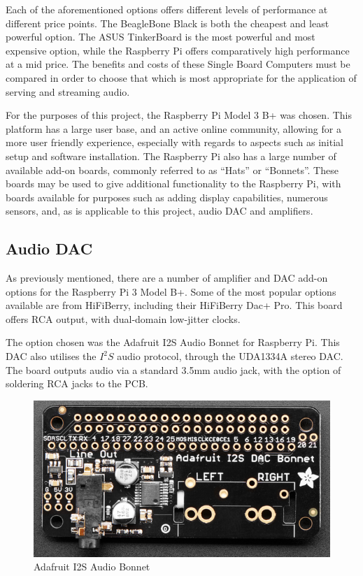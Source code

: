 \documentclass[11pt,a4paper,headinclude=false,footinclude=false]{scrreprt}
\begin{document}
Each of the aforementioned options offers different levels of
performance at different price points. The BeagleBone Black is both the
cheapest and least powerful option. The ASUS TinkerBoard is the most
powerful and most expensive option, while the Raspberry Pi offers
comparatively high performance at a mid price. The benefits and costs of
these Single Board Computers must be compared in order to choose that
which is most appropriate for the application of serving and streaming
audio.

For the purposes of this project, the Raspberry Pi Model 3 B+ was
chosen. This platform has a large user base, and an active online
community, allowing for a more user friendly experience, especially with
regards to aspects such as initial setup and software installation. The
Raspberry Pi also has a large number of available add-on boards,
commonly referred to as ``Hats'' or ``Bonnets''. These boards may be
used to give additional functionality to the Raspberry Pi, with boards
available for purposes such as adding display capabilities, numerous
sensors, and, as is applicable to this project, audio DAC and
amplifiers.

\subsection{Audio DAC}\label{audio-dac}

As previously mentioned, there are a number of amplifier and DAC add-on
options for the Raspberry Pi 3 Model B+. Some of the most popular
options available are from HiFiBerry, including their HiFiBerry Dac+
Pro. This board offers RCA output, with dual-domain low-jitter
clocks\cite{HiFiBerry}.

The option chosen was the Adafruit I2S Audio Bonnet for Raspberry Pi.
This DAC also utilises the \(I^2S\) audio protocol, through the UDA1334A
stereo DAC. The board outputs audio via a standard 3.5mm audio jack,
with the option of soldering RCA jacks to the PCB.

\begin{figure}[H]
\includegraphics{BackgroundLitSurvey/adafruitdac.png}
\centering
\caption{Adafruit I2S Audio Bonnet \cite{adafruit}}
\label{AdaFig}
\end{figure}
\end{document}

